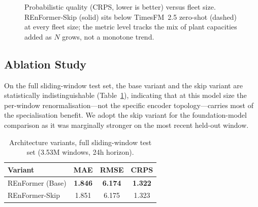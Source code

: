 \documentclass[10pt,twocolumn]{article}
\begin{document}
\begin{figure}[t]
  \centering
  \caption{Probabilistic quality (CRPS, lower is better) versus fleet size.
    REnFormer-Skip (solid) sits below TimesFM~2.5 zero-shot (dashed) at every
    fleet size; the metric level tracks the mix of plant capacities added as
    $N$ grows, not a monotone trend.}
  \label{fig:scaling}
\end{figure}

\subsection{Ablation Study}

On the full sliding-window test set, the base variant and the
skip variant are statistically indistinguishable (Table~\ref{tab:ablation}),
indicating that at this model size the per-window renormalisation---not
the specific encoder topology---carries most of the specialisation
benefit. We adopt the skip variant for the foundation-model comparison
as it was marginally stronger on the most recent held-out window.

\begin{table}[h]
  \centering
  \caption{Architecture variants, full sliding-window test set
    (3.53M windows, 24h horizon).}
  \label{tab:ablation}
  \begin{tabular}{lccc}
    \toprule
    Variant & MAE & RMSE & CRPS \\
    \midrule
    REnFormer (Base)        & \textbf{1.846} & \textbf{6.174} & \textbf{1.322} \\
    REnFormer-Skip           & 1.851 & 6.175 & 1.323 \\
    \bottomrule
  \end{tabular}
\end{table}
\end{document}
